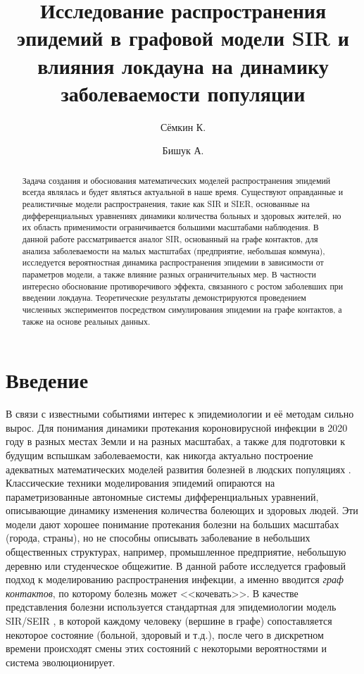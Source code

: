 
\usepackage[backend=biber]{biblatex}



\title{Исследование распространения эпидемий в графовой модели SIR и влияния локдауна на динамику заболеваемости популяции}
\author{Сёмкин К. \and Бишук А.}
\date{}


	
	\maketitle
	
	\begin{abstract}
		Задача создания и обоснования математических моделей распространения эпидемий всегда являлась и будет являться актуальной в наше время. Существуют оправданные и реалистичные модели распространения, такие как SIR и SIER, основанные на дифференциальных уравнениях динамики количества больных и здоровых жителей, но их область применимости ограничивается большими масштабами наблюдения. В данной работе рассматривается аналог SIR, основанный на графе контактов, для анализа заболеваемости на малых мастштабах (предприятие, небольшая коммуна), исследуется вероятностная динамика распространения эпидемии в зависимости от параметров модели, а также влияние разных ограничительных мер. В частности интересно обоснование противоречивого эффекта, связанного с ростом заболевших при введении локдауна. Теоретические результаты демонстрируются проведением численных экспериментов посредством симулирования эпидемии на графе контактов, а также на основе реальных данных.
	\end{abstract}
	
	\section*{Введение}
	
	В связи с известными событиями интерес к эпидемиологии и её методам сильно вырос. Для понимания динамики протекания короновирусной инфекции в 2020 году в разных местах Земли и на разных масштабах, а также для подготовки к будущим вспышкам заболеваемости, как никогда актуально построение адекватных математических моделей развития болезней в людских популяциях \cite{COLIZZA2007364}. Классические техники моделирования эпидемий опираются на параметризованные автономные системы дифференциальных уравнений, описывающие динамику изменения количества болеющих и здоровых людей. Эти модели дают хорошее понимание протекания болезни на больших масштабах (города, страны), но не способны описывать заболевание в небольших общественных структурах, например, промышленное предприятие, небольшую деревню или студенческое общежитие. В данной работе исследуется графовый подход к моделированию распространения инфекции, а именно вводится \textit{граф контактов}, по которому болезнь может <<кочевать>>. В качестве представления болезни используется стандартная для эпидемиологии модель SIR/SEIR \cite{seirsplus}, в которой каждому человеку (вершине в графе) сопоставляется некоторое состояние (больной, здоровый и т.д.), после чего в дискретном времени происходят смены этих состояний с некоторыми вероятностями и система эволюционирует.
	
